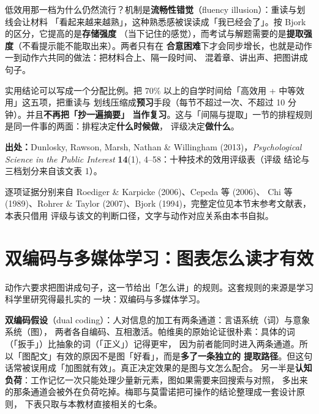 低效用那一档为什么仍然流行？机制是\textbf{流畅性错觉}（fluency illusion）：重读与划线会让材料
「看起来越来越熟」，这种熟悉感被误读成「我已经会了」。按 Bjork 的区分，它提高的是\textbf{存储强度}
（当下记住的感觉），而考试与解题需要的是\textbf{提取强度}（不看提示能不能取出来）。两者只有在
\textbf{合意困难}下才会同步增长，也就是动作一到动作六共同的做法：把材料合上、隔一段时间、
混着章、讲出声、把图讲成句子。

实用结论可以写成一个分配比例。把 $70\%$ 以上的自学时间给「高效用 + 中等效用」这五项，把重读与
划线压缩成\textbf{预习}手段（每节不超过一次、不超过 10 分钟）。并且\textbf{不再把「抄一遍摘要」
当作复习}。这与「间隔与提取」一节的排程规则是同一件事的两面：排程决定\textbf{什么时候做}，
评级决定\textbf{做什么}。

{\footnotesize
\textbf{出处：}Dunlosky, Rawson, Marsh, Nathan \& Willingham (2013)，\textit{Psychological
Science in the Public Interest} \textbf{14}(1), 4--58：十种技术的效用评级表（评级
结论与三档划分来自该文表 1）。

逐项证据分别来自 Roediger \& Karpicke (2006)、Cepeda 等 (2006)、
Chi 等 (1989)、Rohrer \& Taylor (2007)、Bjork (1994)，完整定位见本节末参考文献表，本表只借用
评级与该文的判断口径，文字与动作对应关系由本书自拟。
}

\section{双编码与多媒体学习：图表怎么读才有效}
\label{sec:app-i-dualcode}

动作六要求把图讲成句子，这一节给出「怎么讲」的规则。这套规则的来源是学习科学里研究得最扎实的
一块：双编码与多媒体学习。

\textbf{双编码假设}（dual coding）：人对信息的加工有两条通道：言语系统（词）与意象系统（图），
两者各自编码、互相激活。帕维奥的原始论证很朴素：具体的词（「扳手」）比抽象的词（「正义」）记得更牢，
因为前者能同时进入两条通道。所以「图配文」有效的原因不是图「好看」，而是\textbf{多了一条独立的
提取路径}。但这句话常被误用成「加图就有效」。真正决定效果的是图与文怎么配合。
另一半是\textbf{认知负荷}：工作记忆一次只能处理少量新元素，图如果需要来回搜索与对照，
多出来的那条通道会被外在负荷吃掉。梅耶与莫雷诺把可操作的结论整理成一套设计原则，
下表只取与本教材直接相关的七条。

